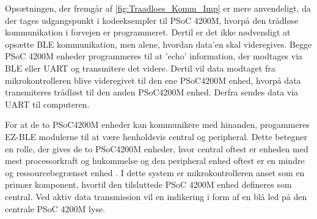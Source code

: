 \noindent
Opsætningen, der fremgår af \autoref{fig:Traadloes_Komm_Imp} er mere anvendeligt, da der tages udgangspunkt i kodeeksempler til PSoC 4200M, hvorpå den trådløse kommunikation i forvejen er programmeret. Dertil er det ikke nødvendigt at opsætte BLE kommunikation, men alene, hvordan data'en skal videregives. 
Begge PSoC 4200M enheder programmeres til at 'echo' information, der modtages via BLE eller UART og transmitere det videre. Dertil vil data modtaget fra mikrokontrolleren blive videregivet til den ene PSoC4200M enhed, hvorpå data transmiteres trådløst til den anden PSoC4200M enhed. Derfra sendes data via UART til computeren. 

For at de to PSoC4200M enheder kan kommunikere med hinanden, progammeres EZ-BLE modulerne til at være henholdsvis central og peripheral. Dette betegner en rolle, der gives de to PSoC4200M enheder, hvor central oftest er enheden med mest processorkraft og hukommelse og den peripheral enhed oftest er en mindre og ressourcebegrænset enhed \citep{townsend2014}. I dette system er mikrokontrolleren anset som en primær komponent, hvortil den tilsluttede PSoC 4200M enhed defineres som central. Ved aktiv data transmission vil en indikering i form af en blå led på den centrale PSoC 4200M lyse.